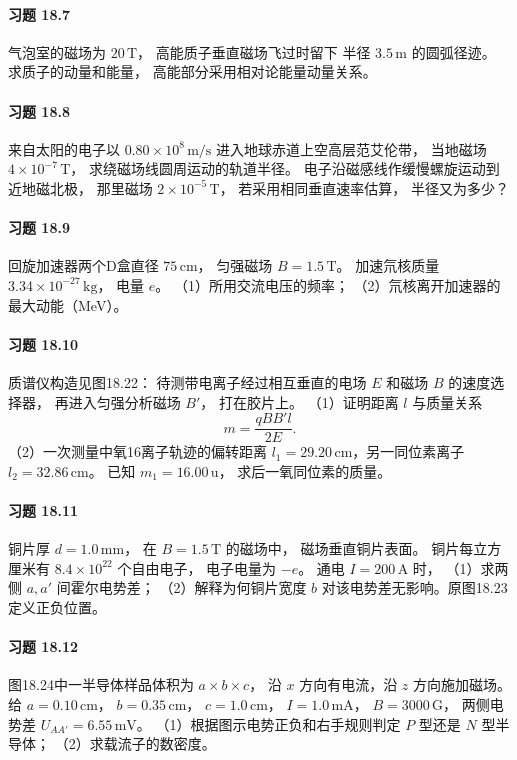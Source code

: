 \paragraph{习题 18.7}
气泡室的磁场为 \(20\,\mathrm T\)，
高能质子垂直磁场飞过时留下
半径 \(3.5\,\mathrm m\) 的圆弧径迹。
求质子的动量和能量，
高能部分采用相对论能量动量关系。

\paragraph{习题 18.8}
来自太阳的电子以
\(0.80\times10^8\,\mathrm{m/s}\)
进入地球赤道上空高层范艾伦带，
当地磁场 \(4\times10^{-7}\,\mathrm T\)，
求绕磁场线圆周运动的轨道半径。
电子沿磁感线作缓慢螺旋运动到近地磁北极，
那里磁场 \(2\times10^{-5}\,\mathrm T\)，
若采用相同垂直速率估算，
半径又为多少？

\paragraph{习题 18.9}
回旋加速器两个D盒直径
\(75\,\mathrm{cm}\)，
匀强磁场 \(B=1.5\,\mathrm T\)。
加速氘核质量 \(3.34\times10^{-27}\,\mathrm{kg}\)，
电量 \(e\)。
（1）所用交流电压的频率；
（2）氘核离开加速器的最大动能（MeV）。

\paragraph{习题 18.10}
质谱仪构造见图18.22：
待测带电离子经过相互垂直的电场 \(E\)
和磁场 \(B\) 的速度选择器，
再进入匀强分析磁场 \(B'\)，
打在胶片上。
（1）证明距离 \(l\) 与质量关系
\[
 m=\frac{qBB'l}{2E}.
\]
（2）一次测量中氧16离子轨迹的偏转距离
\(l_1=29.20\,\mathrm{cm}\)，另一同位素离子
\(l_2=32.86\,\mathrm{cm}\)。
已知 \(m_1=16.00\,\mathrm u\)，
求后一氧同位素的质量。

\paragraph{习题 18.11}
铜片厚 \(d=1.0\,\mathrm{mm}\)，
在 \(B=1.5\,\mathrm T\) 的磁场中，
磁场垂直铜片表面。
铜片每立方厘米有
\(8.4\times10^{22}\) 个自由电子，
电子电量为 \(-e\)。
通电 \(I=200\,\mathrm A\) 时，
（1）求两侧 \(a,a'\) 间霍尔电势差；
（2）解释为何铜片宽度 \(b\)
对该电势差无影响。原图18.23定义正负位置。

\paragraph{习题 18.12}
图18.24中一半导体样品体积为 \(a\times b\times c\)，
沿 \(x\) 方向有电流，沿 \(z\) 方向施加磁场。
给 \(a=0.10\,\mathrm{cm}\)，
\(b=0.35\,\mathrm{cm}\)，
\(c=1.0\,\mathrm{cm}\)，
\(I=1.0\,\mathrm{mA}\)，
\(B=3000\,\mathrm G\)，
两侧电势差 \(U_{AA'}=6.55\,\mathrm{mV}\)。
（1）根据图示电势正负和右手规则判定
\(P\) 型还是 \(N\) 型半导体；
（2）求载流子的数密度。

